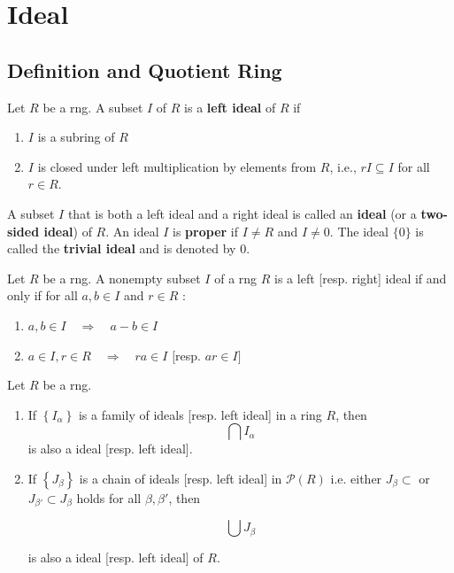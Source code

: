 \section{Ideal} %
\subsection{Definition and Quotient Ring} %
\begin{definition}
    Let $R$ be a rng.
    A subset $I$ of $R$ is a \textbf{left ideal} of $R$ if
    \begin{enumerate}[label=(\roman*)]
        \item  $I$ is a subring of $R$
        \item $I$ is closed under left multiplication by elements from $R$, i.e., $r I \subseteq I$ for all $r \in R$.
    \end{enumerate}
    A subset $I$ that is both a left ideal and a right ideal is called an \textbf{ideal} (or a \textbf{two-sided ideal}) of $R$.
    An ideal $I$ is \textbf{proper} if $I \neq R$ and $I\neq 0$. The ideal $\{0\}$ is called the \textbf{trivial ideal} and is denoted by $0$.
\end{definition}

\begin{theorem}
    Let $R$ be a rng.
    A nonempty subset $I$ of a rng $R$ is a left [resp. right] ideal if and only if for all $a,{b} \in {I}$ and ${r} \in R$ :
    \begin{enumerate}[label=(\roman*)]
        \item
              $a, {b} \in {I} \quad \Rightarrow \quad a-{b} \in {I}$
        \item
              $a \in {I}, {r} \in {R} \quad \Rightarrow \quad {ra} \in {I}$
              $[$resp. ${ar} \in {I}$$]$
    \end{enumerate}
\end{theorem}

\begin{corollary}
    \label{cor: ideal}
    Let $R$ be a rng.
    \begin{enumerate}
        \item If $\left\{I_\alpha \right\}$ is a family of ideals [resp. left ideal] in a ring $R$, then
              \begin{equation*}
                  \bigcap I_\alpha
              \end{equation*}
              is also a ideal [resp. left ideal].

        \item If $\left\{J_\beta\right\}$ is a chain of ideals [resp. left ideal] in $\mathcal{P}(R)$ i.e. either $J_\beta \subset$ or $J_{\beta'} \subset J_\beta$ holds for all $\beta,\beta'$, then

              \begin{equation*}
                  \bigcup J_\beta
              \end{equation*}

              is also a ideal [resp. left ideal] of $R$.
    \end{enumerate}
\end{corollary}

